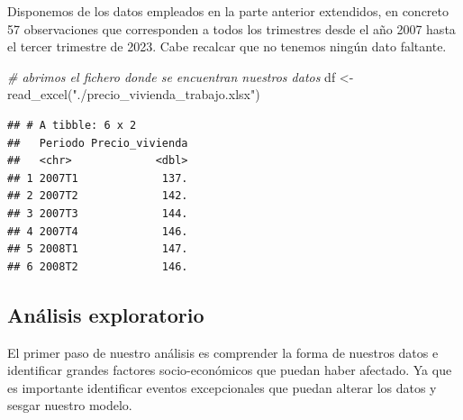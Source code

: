 \documentclass[
]{article}
\newenvironment{Shaded}{\begin{snugshade}}{\end{snugshade}}
\newcommand{\CommentTok}[1]{\textcolor[rgb]{0.56,0.35,0.01}{\textit{#1}}}
\newcommand{\FunctionTok}[1]{\textcolor[rgb]{0.00,0.00,0.00}{#1}}
\newcommand{\NormalTok}[1]{#1}
\newcommand{\OtherTok}[1]{\textcolor[rgb]{0.56,0.35,0.01}{#1}}
\newcommand{\SpecialCharTok}[1]{\textcolor[rgb]{0.00,0.00,0.00}{#1}}
\newcommand{\StringTok}[1]{\textcolor[rgb]{0.31,0.60,0.02}{#1}}
\begin{document}
Disponemos de los datos empleados en la parte anterior extendidos, en
concreto 57 observaciones que corresponden a todos los trimestres desde
el año 2007 hasta el tercer trimestre de 2023. Cabe recalcar que no
tenemos ningún dato faltante.

\begin{Shaded}
\begin{Highlighting}[]
\CommentTok{\# abrimos el fichero donde se encuentran nuestros datos}
\NormalTok{df }\OtherTok{\textless{}{-}} \FunctionTok{read\_excel}\NormalTok{(}\StringTok{"./precio\_vivienda\_trabajo.xlsx"}\NormalTok{)}
\end{Highlighting}
\end{Shaded}

\begin{Shaded}
\end{Shaded}

\begin{verbatim}
## # A tibble: 6 x 2
##   Periodo Precio_vivienda
##   <chr>             <dbl>
## 1 2007T1             137.
## 2 2007T2             142.
## 3 2007T3             144.
## 4 2007T4             146.
## 5 2008T1             147.
## 6 2008T2             146.
\end{verbatim}

\hypertarget{anuxe1lisis-exploratorio-1}{%
\subsection{Análisis exploratorio}\label{anuxe1lisis-exploratorio-1}}

El primer paso de nuestro análisis es comprender la forma de nuestros
datos e identificar grandes factores socio-económicos que puedan haber
afectado. Ya que es importante identificar eventos excepcionales que
puedan alterar los datos y sesgar nuestro modelo.

\begin{Shaded}
\end{Shaded}
\end{document}
